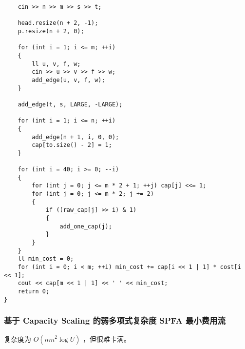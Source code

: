 \documentclass[UTF8]{ctexart}
\begin{document}
\begin{framed}
\begin{lstlisting}
    cin >> n >> m >> s >> t;

    head.resize(n + 2, -1);
    p.resize(n + 2, 0);

    for (int i = 1; i <= m; ++i)
    {
        ll u, v, f, w;
        cin >> u >> v >> f >> w;
        add_edge(u, v, f, w);
    }

    add_edge(t, s, LARGE, -LARGE);

    for (int i = 1; i <= n; ++i)
    {
        add_edge(n + 1, i, 0, 0);
        cap[to.size() - 2] = 1;
    }

    for (int i = 40; i >= 0; --i)
    {
        for (int j = 0; j <= m * 2 + 1; ++j) cap[j] <<= 1;
        for (int j = 0; j <= m * 2; j += 2)
        {
            if ((raw_cap[j] >> i) & 1)
            {
                add_one_cap(j);
            }
        }
    }
    ll min_cost = 0;
    for (int i = 0; i < m; ++i) min_cost += cap[i << 1 | 1] * cost[i << 1];
    cout << cap[m << 1 | 1] << ' ' << min_cost;
    return 0;
}
\end{lstlisting}
\end{framed}

\subsubsection{基于 Capacity Scaling 的弱多项式复杂度 SPFA 最小费用流}

复杂度为 $O(nm^2 \log U)$ ，但很难卡满。
\end{document}
